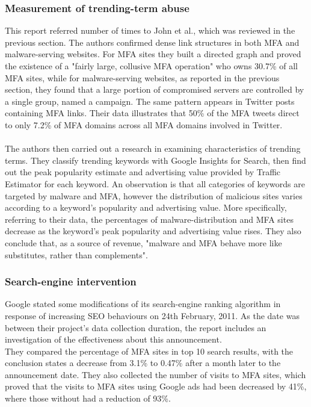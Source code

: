 \subsubsection{Measurement of trending-term abuse}
This report referred number of times to John et al.\cite{deseo}, which was 
reviewed in the previous section. The authors confirmed dense link structures in 
both MFA and malware-serving websites. For MFA sites they built a directed 
graph and proved the existence of a "fairly large, collusive MFA operation" 
who owns 30.7\% of all MFA sites, while for malware-serving websites, as 
reported in the previous section, they found that a large portion of 
compromised servers are controlled by a single group, named a campaign. The 
same pattern appears in Twitter posts containing MFA links. Their data 
illustrates that 50\% of the MFA tweets direct to only 7.2\% of MFA domains 
across all MFA domains involved in Twitter. 
\paragraph{}
The authors then carried out a research in examining characteristics of 
trending terms. They classify trending keywords with Google Insights for 
Search, then find out the peak popularity estimate and advertising value 
provided by Traffic Estimator for each keyword. An observation is that all 
categories of keywords are targeted by malware and MFA, however the 
distribution of malicious sites varies according to a keyword's popularity and 
advertising value. More specifically, referring to their data, the percentages 
of malware-distribution and MFA sites decrease as the keyword's peak 
popularity and advertising value rises. They also conclude that, as a source 
of revenue, "malware and MFA behave more like substitutes, rather than 
complements".\cite{fashioncrime}
\subsubsection{Search-engine intervention}
Google stated some modifications of its search-engine ranking algorithm in 
response of increasing SEO behaviours on 24th February, 2011. As the date was 
between their project's data collection duration, the report includes an 
investigation of the effectiveness about this announcement. \\
They compared the percentage of MFA sites in top 10 search results, with the 
conclusion states a decrease from 3.1\% to 0.47\% after a month later to the 
announcement date. They also collected the number of visits to MFA sites, 
which proved that the visits to MFA sites using Google ads had been decreased 
by 41\%, where those without had a reduction of 93\%. 
